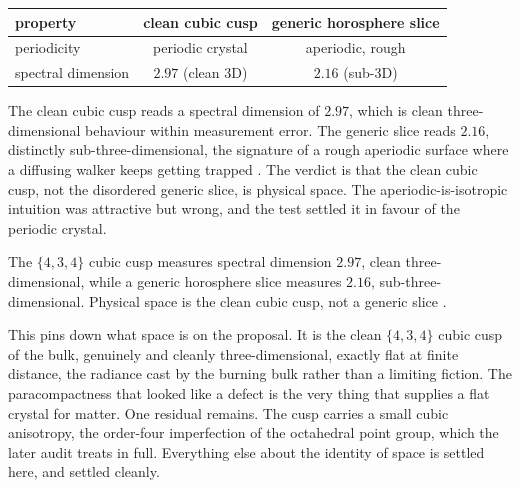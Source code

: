 \begin{table}[h]
\centering
\begin{tabular}{lcc}
\toprule
property & clean cubic cusp & generic horosphere slice \\
\midrule
periodicity & periodic crystal & aperiodic, rough \\
spectral dimension & $2.97$ (clean 3D) & $2.16$ (sub-3D) \\
\bottomrule
\end{tabular}
\end{table}

The clean cubic cusp reads a spectral dimension of $2.97$, which is clean three-dimensional behaviour within
measurement error. The generic slice reads $2.16$, distinctly sub-three-dimensional, the signature of a rough
aperiodic surface where a diffusing walker keeps getting trapped \cite{pollard2026vibetest}. The verdict is that
the clean cubic cusp, not the disordered generic slice, is physical space. The aperiodic-is-isotropic intuition
was attractive but wrong, and the test settled it in favour of the periodic crystal.

\begin{result}
The $\{4,3,4\}$ cubic cusp measures spectral dimension $2.97$, clean three-dimensional, while a generic
horosphere slice measures $2.16$, sub-three-dimensional. Physical space is the clean cubic cusp, not a generic
slice \cite{pollard2026vibetest}.
\end{result}


This pins down what space is on the proposal. It is the clean $\{4,3,4\}$ cubic cusp of the bulk, genuinely and
cleanly three-dimensional, exactly flat at finite distance, the radiance cast by the burning bulk rather than a
limiting fiction. The paracompactness that looked like a defect is the very thing that supplies a flat crystal
for matter. One residual remains. The cusp carries a small cubic anisotropy, the order-four imperfection of the
octahedral point group, which the later audit treats in full. Everything else about the identity of space is
settled here, and settled cleanly.
